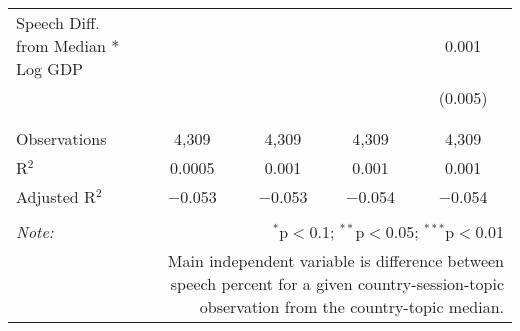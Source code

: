 \begin{table}[!htbp]
\begin{tabular}{@{\extracolsep{5pt}}lcccc}
 Speech Diff. from Median * Log GDP &  &  &  & 0.001 \\ 
  &  &  &  & (0.005) \\ 
  & & & & \\ 
\hline \\[-1.8ex] 
Observations & 4,309 & 4,309 & 4,309 & 4,309 \\ 
R$^{2}$ & 0.0005 & 0.001 & 0.001 & 0.001 \\ 
Adjusted R$^{2}$ & $-$0.053 & $-$0.053 & $-$0.054 & $-$0.054 \\ 
\hline 
\hline \\[-1.8ex] 
\textit{Note:}  & \multicolumn{4}{r}{$^{*}$p$<$0.1; $^{**}$p$<$0.05; $^{***}$p$<$0.01} \\ 
 & \multicolumn{4}{r}{Main independent variable is difference between speech percent for a given country-session-topic observation from the country-topic median.} \\ 
\end{tabular} 
\end{table} 

